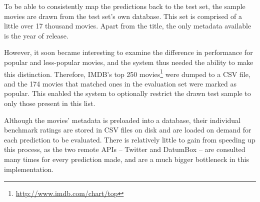 To be able to consistently map the predictions back to the test set, the sample movies are drawn from the test set's own database. This set is comprised of a little over 17 thousand movies. Apart from the title, the only metadata available is the year of release.

However, it soon became interesting to examine the difference in performance for popular and less-popular movies, and the system thus needed the ability to make this distinction. Therefore, IMDB's top 250 movies\footnote{\url{http://www.imdb.com/chart/top}} were dumped to a CSV file, and the 174 movies that matched ones in the evaluation set were marked as popular. This enabled the system to optionally restrict the drawn test sample to only those present in this list.

Although the movies' metadata is preloaded into a database, their individual benchmark ratings are stored in CSV files on disk and are loaded on demand for each prediction to be evaluated. There is relatively little to gain from speeding up this process, as the two remote APIs -- Twitter and DatumBox -- are consulted many times for every prediction made, and are a much bigger bottleneck in this implementation.
